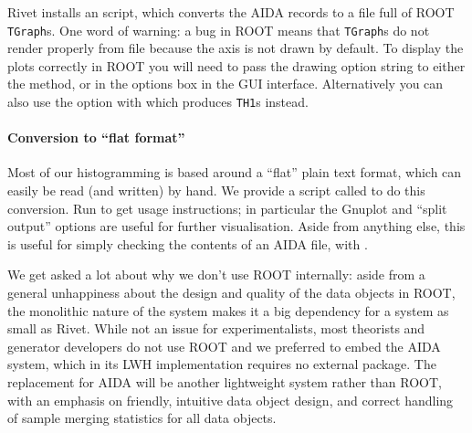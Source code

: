 Rivet installs an
 script, which converts the AIDA records to a  file
full of ROOT \texttt{TGraph}s. One word of warning: a bug in ROOT means that
\texttt{TGraph}s do not render properly from file because the axis is not drawn by
default. To display the plots correctly in ROOT you will need to pass the
 drawing option string to either the  method, or
in the options box in the  GUI interface.
Alternatively you can also use the  option with which 
produces \texttt{TH1}s instead.

\paragraph{Conversion to ``flat format''}

Most of our histogramming is based around a ``flat'' plain text format,
which can easily be read (and written) by hand. We provide a script called
 to do this conversion. Run  to get usage
instructions; in particular the Gnuplot and ``split output'' options are useful
for further visualisation. Aside from anything else, this is useful for simply
checking the contents of an AIDA file, with .

\vspace{1.8em}

\begin{detail}
  We get asked a lot about why we don't use ROOT internally: aside from a
  general unhappiness about the design and quality of the data objects in ROOT,
  the monolithic nature of the system makes it a big dependency for a system as
  small as Rivet. While not an issue for experimentalists, most theorists and
  generator developers do not use ROOT and we preferred to embed the AIDA
  system, which in its LWH implementation requires no external package. The
  replacement for AIDA will be another lightweight system rather than ROOT, with
  an emphasis on friendly, intuitive data object design, and correct handling of
  sample merging statistics for all data objects.
\end{detail}

